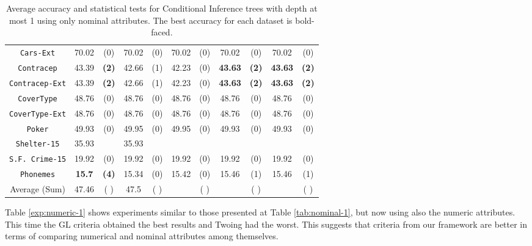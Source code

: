 \begin{table*}
\begin{tabular}{c|cc|cc|cc|cc|cc}
{\tt Cars-Ext}     &70.02       & (0)       & 70.02       & (0)       & 70.02       & (0)       & 70.02       & (0)       & 70.02       & (0)       \\
{\tt Contracep}    &43.39       & {\bf (2)} & 42.66       & (1)       & 42.23       & (0)       & {\bf 43.63} & {\bf (2)} & {\bf 43.63} & {\bf (2)} \\
{\tt Contracep-Ext}&43.39       & {\bf (2)} & 42.66       & (1)       & 42.23       & (0)       & {\bf 43.63} & {\bf (2)} & {\bf 43.63} & {\bf (2)} \\
{\tt CoverType}    &48.76       & (0)       & 48.76       & (0)       & 48.76       & (0)       & 48.76       & (0)       & 48.76       & (0)       \\
{\tt CoverType-Ext}&48.76       & (0)       & 48.76       & (0)       & 48.76       & (0)       & 48.76       & (0)       & 48.76       & (0)       \\
{\tt Poker}        &49.93       & (0)       & 49.95       & (0)       & 49.95       & (0)       & 49.93       & (0)       & 49.93       & (0)       \\  
{\tt Shelter-15}   &35.93       &           & 35.93       &           &             &           &             &           &             &           \\   
{\tt S.F. Crime-15}&19.92       & (0)       & 19.92       & (0)       & 19.92       & (0)       & 19.92       & (0)       & 19.92       & (0)       \\ 
{\tt Phonemes}     &{\bf 15.7}  & {\bf (4)} & 15.34       & (0)       & 15.42       & (0)       & 15.46       & (1)       & 15.46       & (1)       \\ 
\hline
Average (Sum)      & 47.46      & (  )      & 47.5        & (  )      &             & (  )      &             & ( )       &             & (  )   
       \end{tabular}
    \caption{Average accuracy and statistical tests  for  Conditional Inference trees with depth at most 1 using only nominal attributes. The best accuracy for each dataset is bold-faced.}
\label{tab:ctree-1}
\end{table*}


Table \ref{exp:numeric-1} shows experiments  similar to those presented at Table \ref{tab:nominal-1}, but now
using also the numeric attributes. This time the GL criteria obtained the best results and Twoing had the worst. This suggests that criteria from our framework are better in terms of comparing numerical and nominal attributes among themselves.

